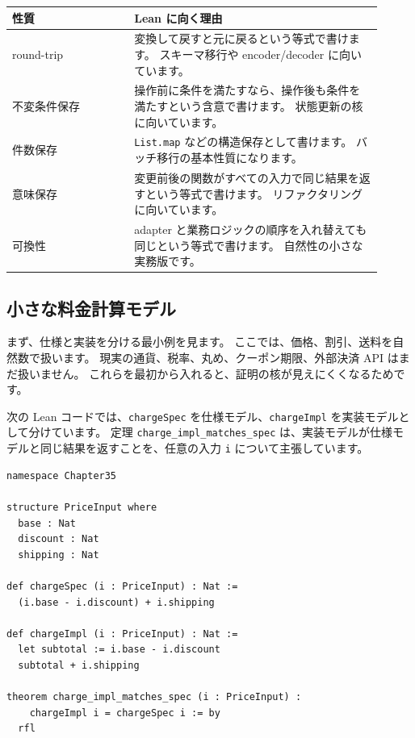 \begin{longtable}{p{0.30\linewidth}p{0.61\linewidth}}
\toprule
\textbf{性質} & \textbf{Lean に向く理由} \\
\midrule
round-trip & 変換して戻すと元に戻るという等式で書けます。
スキーマ移行や encoder/decoder に向いています。 \\
不変条件保存 & 操作前に条件を満たすなら、操作後も条件を満たすという含意で書けます。
状態更新の核に向いています。 \\
件数保存 & \texttt{List.map} などの構造保存として書けます。
バッチ移行の基本性質になります。 \\
意味保存 & 変更前後の関数がすべての入力で同じ結果を返すという等式で書けます。
リファクタリングに向いています。 \\
可換性 & adapter と業務ロジックの順序を入れ替えても同じという等式で書けます。
自然性の小さな実務版です。 \\
\bottomrule
\end{longtable}

\subsection{小さな料金計算モデル}

まず、仕様と実装を分ける最小例を見ます。
ここでは、価格、割引、送料を自然数で扱います。
現実の通貨、税率、丸め、クーポン期限、外部決済 API はまだ扱いません。
これらを最初から入れると、証明の核が見えにくくなるためです。

次の Lean コードでは、\texttt{chargeSpec} を仕様モデル、\texttt{chargeImpl} を実装モデルとして分けています。
定理 \texttt{charge\_impl\_matches\_spec} は、実装モデルが仕様モデルと同じ結果を返すことを、任意の入力 \texttt{i} について主張しています。

\begin{listing}[htbp]
\begin{verbatim}
namespace Chapter35

structure PriceInput where
  base : Nat
  discount : Nat
  shipping : Nat

def chargeSpec (i : PriceInput) : Nat :=
  (i.base - i.discount) + i.shipping

def chargeImpl (i : PriceInput) : Nat :=
  let subtotal := i.base - i.discount
  subtotal + i.shipping

theorem charge_impl_matches_spec (i : PriceInput) :
    chargeImpl i = chargeSpec i := by
  rfl
\end{verbatim}
\caption{\texttt{charge\_impl\_matches\_spec}}
\label{lst:ch35-charge-spec-impl}
\end{listing}

